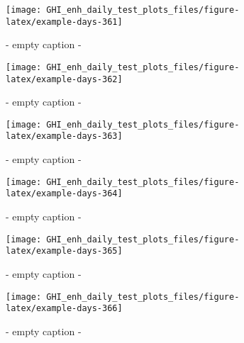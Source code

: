 \documentclass[
  10pt,
  a4paper,oneside]{article}
\begin{document}
\begin{figure}[H]

{\centering \texttt{[image: GHI\_enh\_daily\_test\_plots\_files/figure-latex/example-days-361]} 

}

\caption{ - empty caption - }\label{fig:example-days-361}
\end{figure}

\begin{figure}[H]

{\centering \texttt{[image: GHI\_enh\_daily\_test\_plots\_files/figure-latex/example-days-362]} 

}

\caption{ - empty caption - }\label{fig:example-days-362}
\end{figure}

\begin{figure}[H]

{\centering \texttt{[image: GHI\_enh\_daily\_test\_plots\_files/figure-latex/example-days-363]} 

}

\caption{ - empty caption - }\label{fig:example-days-363}
\end{figure}

\begin{figure}[H]

{\centering \texttt{[image: GHI\_enh\_daily\_test\_plots\_files/figure-latex/example-days-364]} 

}

\caption{ - empty caption - }\label{fig:example-days-364}
\end{figure}

\begin{figure}[H]

{\centering \texttt{[image: GHI\_enh\_daily\_test\_plots\_files/figure-latex/example-days-365]} 

}

\caption{ - empty caption - }\label{fig:example-days-365}
\end{figure}

\begin{figure}[H]

{\centering \texttt{[image: GHI\_enh\_daily\_test\_plots\_files/figure-latex/example-days-366]} 

}

\caption{ - empty caption - }\label{fig:example-days-366}
\end{figure}
\end{document}
